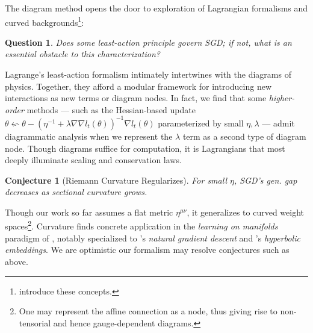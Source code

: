 \documentclass{article}
\theoremstyle{plain}
\newtheorem{conj}{Conjecture}
\newtheorem{quest}{Question}
\theoremstyle{definition}
\begin{document}
        The diagram method opens the door to exploration of Lagrangian
        formalisms and curved backgrounds\footnote{
            \cite{la60, la51} introduce these concepts.
        }:
        \begin{quest}
            Does some least-action principle govern SGD; if not, what is an
            essential obstacle to this characterization?
        \end{quest}
        Lagrange's least-action formalism intimately intertwines with the
        diagrams of physics.  Together, they afford a modular framework for
        introducing new interactions as new terms or diagram nodes.  In fact,
        we find that some \emph{higher-order} methods --- such as the
        Hessian-based update
        $
            \theta \leftsquigarrow
            \theta -
            (\eta^{-1} + \lambda \nabla \nabla l_t(\theta))^{-1}
            \nabla l_t(\theta)
        $
        parameterized by small $\eta, \lambda$ --- admit diagrammatic analysis
        when we represent the $\lambda$ term as a second type of diagram node.
        Though diagrams suffice for computation, it is Lagrangians that most
        deeply illuminate scaling and conservation laws.
        \begin{conj}[Riemann Curvature Regularizes]
            For small $\eta$, SGD's gen. gap decreases as sectional curvature
            grows.
        \end{conj}
        Though our work so far assumes a flat metric $\eta^{\mu\nu}$, it
        generalizes to curved weight spaces\footnote{
            One may represent the affine connection as a node, thus giving
            rise to non-tensorial and hence gauge-dependent diagrams.
        }.
        Curvature finds concrete application in the \emph{learning on
        manifolds} paradigm of \citet{ab07, zh16}, notably specialized to
        \citet{am98}'s \emph{natural gradient descent} and \citet{ni17}'s
        \emph{hyperbolic embeddings}.  We are optimistic our formalism may
        resolve conjectures such as above.


    

\end{document}
